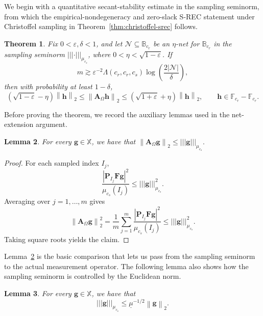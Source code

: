 \documentclass{article}
\theoremstyle{plain}
\newtheorem{theorem}{Theorem}[section]
\newtheorem{lemma}[theorem]{Lemma}
\theoremstyle{definition}
\theoremstyle{remark}
\newcommand*{\snorm}[2]{\left\vert\!\left\vert\!\left\vert #1 \right\vert\!\right\vert\!\right\vert_{#2}}
\begin{document}
We begin with a quantitative secant-stability estimate in the sampling seminorm, from which the empirical-nondegeneracy and zero-slack S-REC statement under Christoffel sampling in Theorem~\ref{thm:christoffel-srec} follows.


\begin{theorem}
  \label{thm:secant-stability}
    Fix $0<\varepsilon,\delta<1$, and let $\mathcal N\subseteq \mathbb{B}_{c_r}$ be an $\eta$-net for $\mathbb{B}_{c_r}$ in the sampling seminorm $\snorm{\cdot}{\mu_{c_s}}$, where $0<\eta<\sqrt{1-\varepsilon}$. If
  \[
    m \gtrsim \varepsilon^{-2}\Lambda\left(c_r,c_r,c_s\right)\log\left(\frac{2\left|\mathcal N\right|}{\delta}\right),
  \]
  then with probability at least $1-\delta$,
  \[
    \left(\sqrt{1-\varepsilon}-\eta\right)\left\|\mathbf{h}\right\|_2
    \leq
    \left\|\mathbf{A}_\Omega \mathbf{h}\right\|_2
    \leq
    \left(\sqrt{1+\varepsilon}+\eta\right)\left\|\mathbf{h}\right\|_2,
    \qquad
    \mathbf{h}\in \mathbb{F}_{c_r}-\mathbb{F}_{c_r}.
  \]
\end{theorem}

Before proving the theorem, we record the auxiliary lemmas used in the net-extension argument.

\begin{lemma}
  \label{lem:seminorm-domination}
  For every $\mathbf{g}\in\mathbb{X}$, we have that 
  $
    \left\|\mathbf{A}_\Omega\mathbf{g}\right\|_2
    \leq
    \snorm{\mathbf{g}}{\mu_{c_s}}.
  $
\end{lemma}

\begin{proof}
  For each sampled index $I_j$,
  \[
    \frac{\left|\mathbf{P}_{I_j}\mathbf{F}\mathbf{g}\right|^2}{\mu_{c_s}\left(I_j\right)}
    \leq 
    \snorm{\mathbf g}{\mu_{c_s}}^2.
  \]
  Averaging over $j=1,\dots,m$ gives
  \[
    \left\|\mathbf{A}_\Omega\mathbf{g}\right\|_2^2
    =
    \frac{1}{m}\sum_{j=1}^m
    \frac{\left|\mathbf{P}_{I_j}\mathbf{F}\mathbf{g}\right|^2}{\mu_{c_s}\left(I_j\right)}
    \leq
    \snorm{\mathbf g}{\mu_{c_s}}^2.
  \]
  Taking square roots yields the claim.
\end{proof}

Lemma~\ref{lem:seminorm-domination} is the basic comparison that lets us pass from the sampling seminorm to the actual measurement operator. The following lemma also shows how the sampling seminorm is controlled by the Euclidean norm.

\begin{lemma}
    \label{lem:active-support-seminorm-comparison}
  For every $\mathbf g\in \mathbb X$, we have that
  \[
    \snorm{\mathbf g}{\mu_{c_s}}
    \leq
    \underline{\mu}^{-1/2}
    \left\|\mathbf g\right\|_2.
  \]
\end{lemma}
\end{document}
